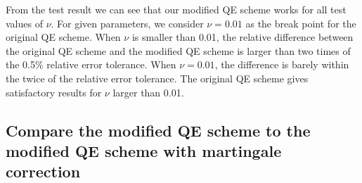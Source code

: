 \documentclass{ws-ijfe}
\begin{document}
\begin{table}[h]
\caption{Test of European call options with $\nu$ close or equal to zero}
\label{table:nu=0}
\centering
{}
\end{table}
From the test result we can see that our modified QE scheme works for all test values of $\nu$. For given parameters, we consider $\nu=0.01$ as the break point for the original QE scheme. When $\nu$ is smaller than 0.01, the relative difference between the original QE scheme and the modified QE scheme is larger than two times of the 0.5\% relative error tolerance. When $\nu=0.01$, the difference is barely within the twice of the relative error tolerance. The original QE scheme gives satisfactory results for $\nu$ larger than 0.01.

\subsection{Compare the modified QE scheme to the modified QE scheme with martingale correction}
\end{document}
